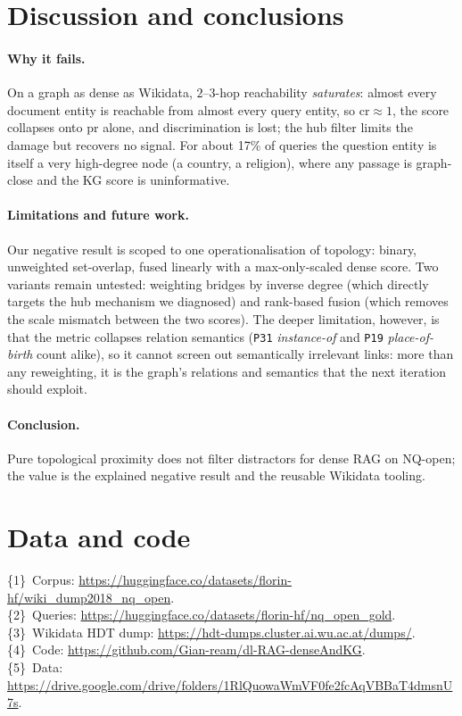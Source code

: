 \documentclass{article}
\begin{document}
\section{Discussion and conclusions}

\paragraph*{Why it fails.} On a graph as dense as Wikidata, $2$--$3$-hop reachability \emph{saturates}: almost every document entity is reachable from almost every query entity, so $\mathrm{cr}\approx 1$, the score collapses onto $\mathrm{pr}$ alone, and discrimination is lost; the hub filter limits the damage but recovers no signal. For about 17\% of queries the question entity is itself a very high-degree node (a country, a religion), where any passage is graph-close and the KG score is uninformative.

\paragraph*{Limitations and future work.} Our negative result is scoped to one operationalisation of topology: binary, unweighted set-overlap, fused linearly with a max-only-scaled dense score. Two variants remain untested: weighting bridges by inverse degree (which directly targets the hub mechanism we diagnosed) and rank-based fusion (which removes the scale mismatch between the two scores). The deeper limitation, however, is that the metric collapses relation semantics (\texttt{P31} \emph{instance-of} and \texttt{P19} \emph{place-of-birth} count alike), so it cannot screen out semantically irrelevant links: more than any reweighting, it is the graph's relations and semantics that the next iteration should exploit.

\paragraph*{Conclusion.} Pure topological proximity does not filter distractors for dense RAG on NQ-open; the value is the explained negative result and the reusable Wikidata tooling.

\section*{Data and code}
{\footnotesize\raggedright\noindent
\{1\}~Corpus: \url{https://huggingface.co/datasets/florin-hf/wiki_dump2018_nq_open}.\\
\{2\}~Queries: \url{https://huggingface.co/datasets/florin-hf/nq_open_gold}.\\
\{3\}~Wikidata HDT dump: \url{https://hdt-dumps.cluster.ai.wu.ac.at/dumps/}.\\
\{4\}~Code: \url{https://github.com/Gian-ream/dl-RAG-denseAndKG}.\\
\{5\}~Data: \url{https://drive.google.com/drive/folders/1RlQuowaWmVF0fe2fcAqVBBaT4dmsnU7s}.}
\end{document}
